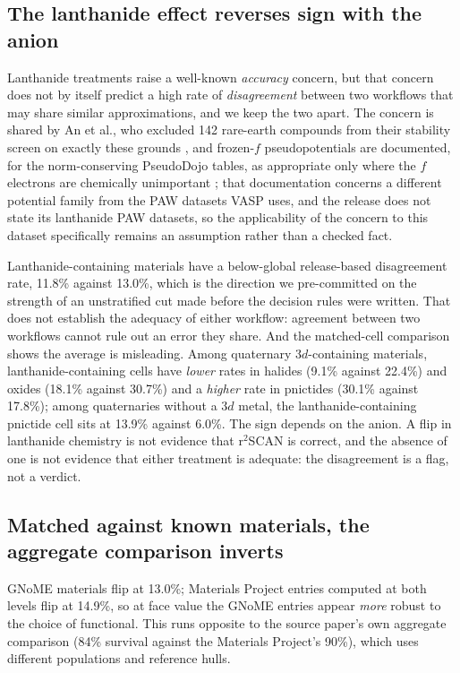 \documentclass[11pt]{article}
\begin{document}
\subsection{The lanthanide effect reverses sign with the anion}\label{sec:ln}

Lanthanide treatments raise a well-known \emph{accuracy} concern, but that concern does
not by itself predict a high rate of \emph{disagreement} between two workflows that may
share similar approximations, and we keep the two apart. The concern is shared by An
et al., who excluded 142 rare-earth compounds from their stability screen on exactly these
grounds \citep{an2026}, and frozen-$f$ pseudopotentials are documented, for the
norm-conserving PseudoDojo tables, as appropriate only where the $f$ electrons are
chemically unimportant \citep{pseudodojo2018}; that documentation concerns a different
potential family from the PAW datasets VASP uses, and the release does not state its
lanthanide PAW datasets, so the applicability of the concern to this dataset specifically
remains an assumption rather than a checked fact.

Lanthanide-containing materials have a below-global release-based disagreement rate,
11.8\% against 13.0\%, which is the direction we pre-committed on the strength of an
unstratified cut made before the decision rules were written. That does not establish
the adequacy of either workflow: agreement between two workflows cannot rule out an error
they share. And the matched-cell comparison shows the average is misleading. Among
quaternary 3$d$-containing materials, lanthanide-containing cells have \emph{lower}
rates in halides (9.1\% against 22.4\%) and oxides (18.1\% against 30.7\%) and a
\emph{higher} rate in pnictides (30.1\% against 17.8\%); among quaternaries without a
3$d$ metal, the lanthanide-containing pnictide cell sits at 13.9\% against 6.0\%. The
sign depends on the anion. A flip in lanthanide chemistry is not evidence that r$^2$SCAN
is correct, and the absence of one is not evidence that either treatment is adequate:
the disagreement is a flag, not a verdict.

\subsection{Matched against known materials, the aggregate comparison inverts}\label{sec:known}

GNoME materials flip at 13.0\%; Materials Project entries computed at both levels flip
at 14.9\%, so at face value the GNoME entries appear \emph{more} robust to the choice of functional. This
runs opposite to the source paper's own aggregate comparison (84\% survival against the
Materials Project's 90\%), which uses different populations and reference hulls.
\end{document}

